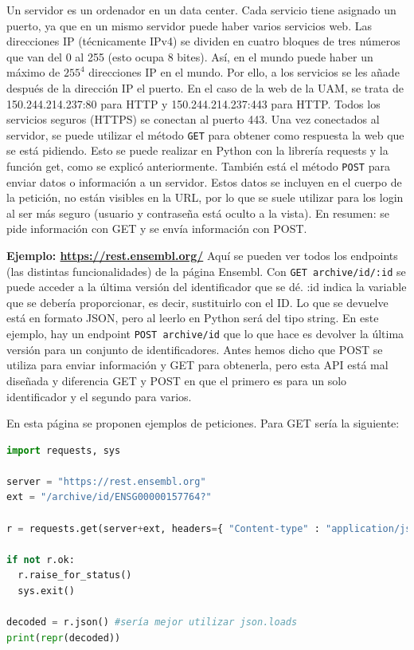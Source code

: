 Un servidor es un ordenador en un data center. Cada servicio tiene asignado un puerto, ya que en un mismo servidor puede haber varios servicios web. Las direcciones IP (técnicamente IPv4) se dividen en cuatro bloques de tres números que van del 0 al 255 (esto ocupa 8 bites). Así, en el mundo puede haber un máximo de $255^4$ direcciones IP en el mundo. Por ello, a los servicios se les añade después de la dirección IP el puerto. En el caso de la web de la UAM, se trata de 150.244.214.237:80 para HTTP y 150.244.214.237:443 para HTTP. Todos los servicios seguros (HTTPS) se conectan al puerto 443. Una vez conectados al servidor, se puede utilizar el método \texttt{GET} para obtener como respuesta la web que se está pidiendo. Esto se puede realizar en Python con la librería requests y la función get, como se explicó anteriormente. También está el método \texttt{POST} para enviar datos o información a un servidor. Estos datos se incluyen en el cuerpo de la petición, no están visibles en la URL, por lo que se suele utilizar para los login al ser más seguro (usuario y contraseña está oculto a la vista). En resumen: se pide información con GET y se envía información con POST. 

\textbf{Ejemplo: \href{https://rest.ensembl.org/}{https://rest.ensembl.org/}}
Aquí se pueden ver todos los endpoints (las distintas funcionalidades) de la página Ensembl. 
Con \texttt{GET archive/id/:id} se puede acceder a la última versión del identificador que se dé. :id indica la variable que se debería proporcionar, es decir, sustituirlo con el ID. Lo que se devuelve está en formato JSON, pero al leerlo en Python será del tipo string. En este ejemplo, hay un endpoint \texttt{POST archive/id} que lo que hace es devolver la última versión para un conjunto de identificadores. Antes hemos dicho que POST se utiliza para enviar información y GET para obtenerla, pero esta API está mal diseñada y diferencia GET y POST en que el primero es para un solo identificador y el segundo para varios.

En esta página se proponen ejemplos de peticiones. Para GET sería la siguiente:
\begin{lstlisting}[language=Python]
import requests, sys
 
server = "https://rest.ensembl.org"
ext = "/archive/id/ENSG00000157764?"
 
r = requests.get(server+ext, headers={ "Content-type" : "application/json"})
 
if not r.ok:
  r.raise_for_status()
  sys.exit()
 
decoded = r.json() #sería mejor utilizar json.loads 
print(repr(decoded))
\end{lstlisting}

